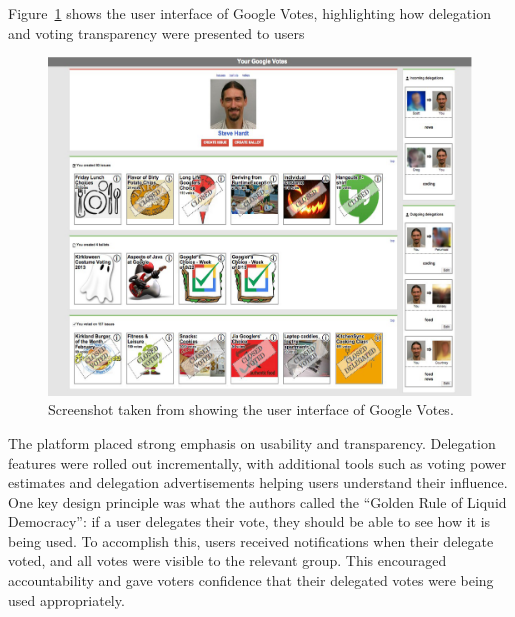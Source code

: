 Figure~\ref{fig:google_votes} shows the user interface of Google Votes, highlighting how delegation and voting transparency were presented to users

\begin{figure}[H]
  \centering
  \includegraphics[width=0.8\linewidth]{../common/google_votes.png}
  \caption{Screenshot taken from \citet{hardt_google_2015} showing the user interface of Google Votes.}
  \label{fig:google_votes}
\end{figure}



The platform placed strong emphasis on usability and transparency. Delegation features were rolled out incrementally, with additional tools such as voting power estimates and delegation advertisements helping users understand their influence. One key design principle was what the authors called the ``Golden Rule of Liquid Democracy'': if a user delegates their vote, they should be able to see how it is being used. To accomplish this, users received notifications when their delegate voted, and all votes were visible to the relevant group. This encouraged accountability and gave voters confidence that their delegated votes were being used appropriately.

